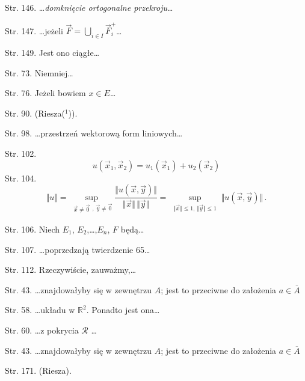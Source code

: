 \documentclass[a4paper,11pt]{article}
\begin{document}
\start Str. 146. \ldots\textit{domknięcie ortogonalne przekroju}\ldots

\start Str. 147. \ldots jeżeli
$\vec{ F } = \bigcup_{ i \in I } \vec{ F }_{ i }^{ + }$\ldots

\start Str. 149. Jest ono ciągłe\ldots

\start Str. 73. Niemniej\ldots

\start Str. 76. Jeżeli bowiem $x \in E$\ldots

\start Str. 90. \large{(Riesza($^{ 1 }$))}.

\start Str. 98. \ldots przestrzeń wektorową form liniowych\ldots

\start Str. 102.
$$u(\vec{x}_{1},\vec{x}_{2})=u_{1}(\vec{x}_{1})+u_{2}(\vec{x}_{2})$$
\start Str. 104.
$$\Vert u \Vert = \sup_{ \substack{ \vec{ x } \neq \vec{ 0 } },
  \,\vec{ y } \neq \vec{ 0 } } \frac{ \Vert u( \vec x, \vec y ) \Vert
}{ \Vert \vec{ x } \Vert \, \Vert \vec y \Vert } = \sup_{ \substack{
    \Vert \vec{ x } \Vert \leq 1, \, \Vert \vec{ y } \Vert \leq 1 } }
\Vert u( \vec x, \vec y ) \Vert \, .$$

\start Str. 106. Niech $E_{ 1 }$, $E_{ 2 }$,\ldots,$E_{ n }$, $F$
będą\ldots

\start Str. 107. \ldots poprzedzają twierdzenie 65\ldots

\start Str. 112. Rzeczywiście, zauważmy,\ldots

\start Str. 43. \ldots znajdowałyby się w zewnętrzu $A$; jest to
przeciwne do założenia $a \in \overline{ A }$

\start Str. 58. \ldots układu w $\mathbb{R}^{ 2 }$. Ponadto jest
ona\ldots

\start Str. 60. \ldots z pokrycia $\mathcal{R}$ \ldots

\start Str. 43. \ldots znajdowałyby się w zewnętrzu $A$; jest to
przeciwne do założenia $a \in \overline{ A }$


\start Str. 171. \large{(Riesza)}.










\newpage
{}


\end{document}
